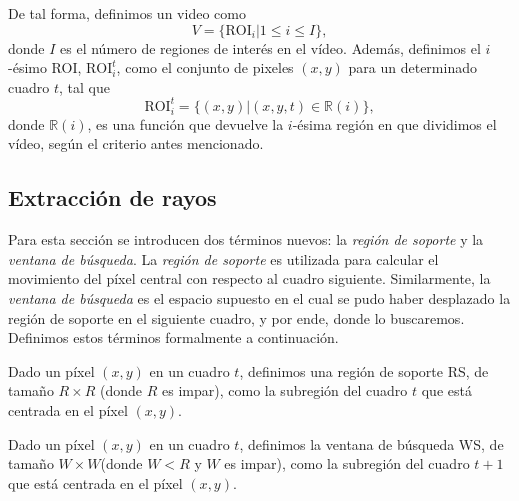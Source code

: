 	De tal forma, definimos un video como 
	\begin{equation}\label{algoritmo:eq:video}		
		V = \{\text{ROI}_i | 1 \leq i \le I\}, 
	\end{equation}
	donde $I$ es el número de regiones de interés en el vídeo. Además, definimos el $i$-ésimo ROI, $\text{ROI}_i^t$, como el conjunto de pixeles $(x,y)$ para un determinado cuadro $t$, tal que
	\begin{equation}\label{algoritmo:eq:roi}
		\text{ROI}_{i}^{t} = \{(x,y) | (x,y,t) \in \mathds{R}(i)\},
	\end{equation}
	donde $\mathds{R}(i)$, es una función que devuelve la $i$-ésima región en que dividimos el vídeo, según el criterio antes mencionado.

	\subsection{Extracción de rayos}
	\label{algoritmo:ext_rayos}
	
	Para esta sección se introducen dos términos nuevos: la \textit{región de soporte} y la \textit{ventana de búsqueda}. La \textit{región de soporte} es utilizada para calcular el movimiento del píxel central con respecto al cuadro siguiente. Similarmente, la \textit{ventana de búsqueda} es el espacio supuesto en el cual se pudo haber desplazado la región de soporte en el siguiente cuadro, y por ende, donde lo buscaremos. Definimos estos términos formalmente a continuación.
	
	\begin{definition}	
  Dado un píxel $(x,y)$ en un cuadro $t$, definimos una región de soporte RS, de tamaño $R \times R$ (donde $R$ es impar), como la subregión del cuadro $t$ que está centrada en el píxel $(x,y)$.
	\end{definition}

	\begin{definition}
	Dado un píxel $(x,y)$ en un cuadro $t$, definimos la ventana de búsqueda WS, de  tamaño $W \times W$(donde $W < R$ y $W$ es impar), como la subregión del cuadro $t+1$ que está centrada en el píxel $(x,y)$.
	\end{definition}
		
